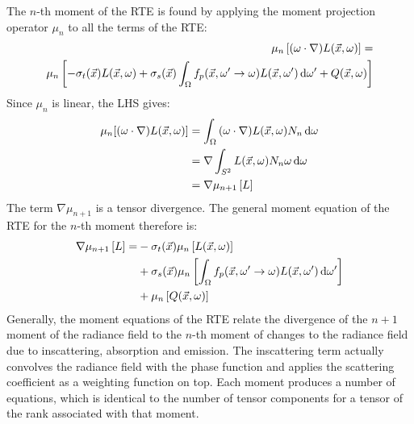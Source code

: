 The $n$-th moment of the RTE is found by applying the moment projection operator $\mu_n$ to all the terms of the RTE:
\begin{align*}
\mu_n\left[(\omega\cdot\nabla)L(\vec{x}, \omega)\right]=&\\
\mu_n\left[-\sigma_t(\vec{x})L(\vec{x}, \omega) + \sigma_s(\vec{x})\int_{\Omega}f_p(\vec{x}, \omega'\rightarrow\omega)L(\vec{x}, \omega')\,\mathrm{d}\omega' + Q(\vec{x}, \omega)\right]
\end{align*}
Since $\mu_n$ is linear, the LHS gives:
\begin{align*}
\mu_n[(\omega \cdot \nabla)L(\vec{x}, \omega)] & = \int_{\Omega}{(\omega\cdot\nabla)L(\vec{x}, \omega)N_n\,\mathrm{d}\omega}\\
							     & =\nabla\int_{S^2}{L(\vec{x}, \omega)N_n\omega\,\mathrm{d}\omega} \\
							     & =\nabla\mu_{n+1}\left[L\right]
\end{align*}
The term $\nabla\mu_{n+1}$ is a tensor divergence. The general moment equation of the RTE for the $n$-th moment therefore is:
\begin{align}
\nonumber
\nabla\mu_{n+1}\left[L\right] =&
-\sigma_t(\vec{x})\mu_n\left[L(\vec{x}, \omega)\right]\\
\label{eq:gme}
&+\sigma_s(\vec{x})\mu_n\left[\int_{\Omega}f_p(\vec{x}, \omega'\rightarrow\omega) L(\vec{x}, \omega')\,\mathrm{d}\omega'\right]\\
\nonumber
&+\mu_n\left[Q(\vec{x}, \omega)\right]
\end{align}
Generally, the moment equations of the RTE relate the divergence of the $n+1$ moment of the radiance field to the $n$-th moment of changes to the radiance field due to inscattering, absorption and emission. The inscattering term actually convolves the radiance field with the phase function and applies the scattering coefficient as a weighting function on top. Each moment produces a number of equations, which is identical to the number of tensor components for a tensor of the rank associated with that moment.

